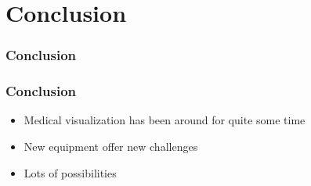 \documentclass{beamer}
\begin{document}
\section{Conclusion}
\begin{frame}
	\frametitle{Conclusion}
\end{frame}

\begin{frame}
	\frametitle{Conclusion}
	\begin{itemize}
		\item Medical visualization has been around for quite some time
		\item New equipment offer new challenges
		\item Lots of possibilities
	\end{itemize}
\end{frame}


%
\end{document}
